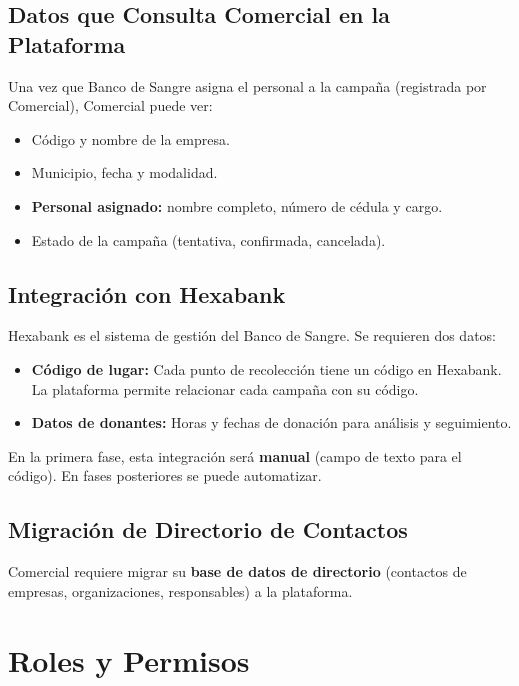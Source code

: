 \documentclass[9pt,a4paper]{extarticle}
\begin{document}
\subsection{Datos que Consulta Comercial en la Plataforma}

Una vez que Banco de Sangre asigna el personal a la campaña (registrada por Comercial), Comercial puede ver:

\begin{itemize}[leftmargin=2em]
    \item C\'{o}digo y nombre de la empresa.
    \item Municipio, fecha y modalidad.
    \item \textbf{Personal asignado:} nombre completo, n\'{u}mero de c\'{e}dula y cargo.
    \item Estado de la campaña (tentativa, confirmada, cancelada).
\end{itemize}

\subsection{Integraci\'{o}n con Hexabank}

Hexabank es el sistema de gesti\'{o}n del Banco de Sangre. Se requieren dos datos:

\begin{itemize}[leftmargin=2em]
    \item \textbf{C\'{o}digo de lugar:} Cada punto de recolecci\'{o}n tiene un c\'{o}digo en Hexabank. La plataforma permite relacionar cada campaña con su c\'{o}digo.
    \item \textbf{Datos de donantes:} Horas y fechas de donaci\'{o}n para an\'{a}lisis y seguimiento.
\end{itemize}

En la primera fase, esta integraci\'{o}n ser\'{a} \textbf{manual} (campo de texto para el c\'{o}digo). En fases posteriores se puede automatizar.

\subsection{Migraci\'{o}n de Directorio de Contactos}

Comercial requiere migrar su \textbf{base de datos de directorio} (contactos de empresas, organizaciones, responsables) a la plataforma.

\section{Roles y Permisos}
\end{document}
